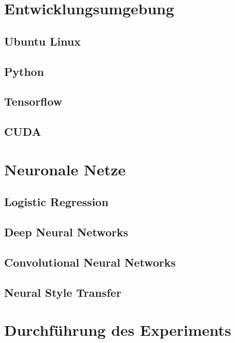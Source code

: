 \chapter{Entwicklungsumgebung}
\label{ch:latex}

\section{Ubuntu Linux}
\label{sec:ubuntu}

\section{Python}
\label{sec:python}

\section{Tensorflow}
\label{sec:tensorflow}

\section{CUDA}
\label{sec:cuda}

\chapter{Neuronale Netze}
\label{ch:neuralnets}

\section{Logistic Regression}
\label{sec:logreg}

\section{Deep Neural Networks}
\label{sec:dnn}

\section{Convolutional Neural Networks}
\label{sec:cnn}

\section{Neural Style Transfer}
\label{sec:nst}


\chapter{Durchführung des Experiments}
\label{ch:conduct}

